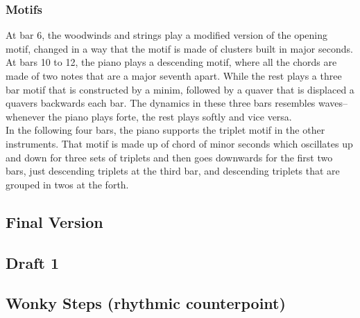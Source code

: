 \documentclass{article}
\newcommand\emptypage{
    \null
    \thispagestyle{empty}
    \newpage
    }
\begin{document}
\subsubsection{Motifs}

At bar 6, the woodwinds and strings play a modified version of the opening
motif, changed in a way that the motif is made of clusters built in major
seconds.  At bars 10 to 12, the piano plays a descending motif, where all the
chords are made of two notes that are a major seventh apart.  While the rest
plays a three bar motif that is constructed by a minim, followed by a quaver
that is displaced a quavers backwards each bar.  The dynamics in these three bars
resembles waves--whenever the piano plays forte, the rest plays softly and vice
versa.\\

In the following four bars, the piano supports the triplet motif in the other
instruments.  That motif is made up of chord of minor seconds which oscillates
up and down for three sets of triplets and then goes downwards for the first
two bars, just descending triplets at the third bar, and descending triplets
that are grouped in twos at the forth.\\

\newpage
\begin{center}
\vspace*{\fill}
\LARGE
\subsection{Final Version}
\vspace*{\fill}
%
\end{center}

\newpage
\begin{center}
\vspace*{\fill}
\LARGE
\subsection{Draft 1}
\vspace*{\fill}
%
\end{center}
\newpage
\emptypage
\emptypage
\emptypage
\emptypage
\emptypage
\emptypage
\emptypage
\emptypage
\emptypage
\emptypage
\emptypage
\emptypage

\begin{center}
\vspace*{\fill}
\LARGE
    \section{Wonky Steps (rhythmic counterpoint)}
\vspace*{\fill}
%
\end{center}
\end{document}
